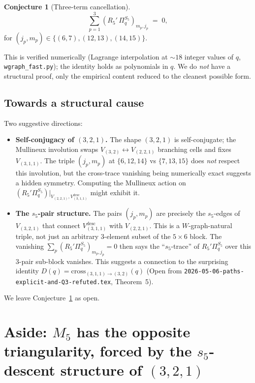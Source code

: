 \documentclass[11pt]{article}
\theoremstyle{definition}
\newtheorem{conjecture}[theorem]{Conjecture}
\begin{document}
\begin{conjecture}[Three-term cancellation]\label{conj:three-term}
\[
\sum_{p=1}^3 (R_5'\,\Pi_q^{S_5})_{m_p, j_p} \;=\; 0,
\]
for $(j_p, m_p) \in \{(6,7), (12,13), (14,15)\}$.
\end{conjecture}

This is verified numerically (Lagrange interpolation at $\sim 18$ integer values of $q$, \texttt{wgraph\_fast.py}); the identity holds as polynomials in $q$. We do \emph{not} have a structural proof, only the empirical content reduced to the cleanest possible form.

\subsection*{Towards a structural cause}

Two suggestive directions:
\begin{itemize}[leftmargin=2em,topsep=0.3em,itemsep=0.2em]
\item \textbf{Self-conjugacy of $(3,2,1)$.} The shape $(3,2,1)$ is self-conjugate; the Mullineux involution swaps $V_{(3,2)} \leftrightarrow V_{(2,2,1)}$ branching cells and fixes $V_{(3,1,1)}$. The triple $(j_p, m_p)$ at $\{6,12,14\}$ vs $\{7,13,15\}$ does \emph{not} respect this involution, but the cross-trace vanishing being numerically exact suggests a hidden symmetry. Computing the Mullineux action on $(R_5'\Pi_q^{S_5})|_{V_{(2,2,1)}, V_{(3,1,1)}^{\text{desc}}}$ might exhibit it.
\item \textbf{The $s_5$-pair structure.} The pairs $(j_p, m_p)$ are precisely the $s_5$-edges of $V_{(3,2,1)}$ that connect $V_{(3,1,1)}^{\text{desc}}$ with $V_{(2,2,1)}$. This is a $W$-graph-natural triple, not just an arbitrary 3-element subset of the $5 \times 6$ block. The vanishing $\sum_p (R_5'\Pi_q^{S_5})_{m_p, j_p} = 0$ then says the ``$s_5$-trace'' of $R_5'\Pi_q^{S_5}$ over this 3-pair sub-block vanishes. This suggests a connection to the surprising identity $D(q) = \mathrm{cross}_{(3,1,1)\to(3,2)}(q)$ (Open from \texttt{2026-05-06-paths-explicit-and-Q3-refuted.tex}, Theorem~5).
\end{itemize}

We leave Conjecture~\ref{conj:three-term} as open.

\section{Aside: $M_5$ has the opposite triangularity, forced by the $s_5$-descent structure of $(3,2,1)$}\label{sec:M5}
\end{document}
